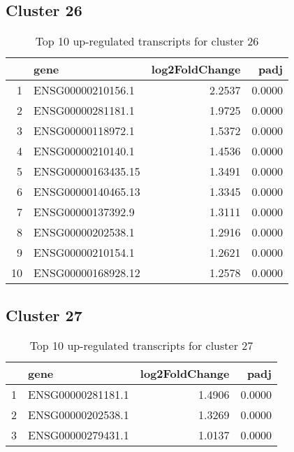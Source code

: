 \documentclass{article}
\begin{document}
\subsection{Cluster 26 }
\begin{table}[H]
\centering
\begin{tabularx}{\textwidth}{rlrr}
  \hline
 & gene & log2FoldChange & padj \\ 
  \hline
1 & ENSG00000210156.1 & 2.2537 & 0.0000 \\ 
  2 & ENSG00000281181.1 & 1.9725 & 0.0000 \\ 
  3 & ENSG00000118972.1 & 1.5372 & 0.0000 \\ 
  4 & ENSG00000210140.1 & 1.4536 & 0.0000 \\ 
  5 & ENSG00000163435.15 & 1.3491 & 0.0000 \\ 
  6 & ENSG00000140465.13 & 1.3345 & 0.0000 \\ 
  7 & ENSG00000137392.9 & 1.3111 & 0.0000 \\ 
  8 & ENSG00000202538.1 & 1.2916 & 0.0000 \\ 
  9 & ENSG00000210154.1 & 1.2621 & 0.0000 \\ 
  10 & ENSG00000168928.12 & 1.2578 & 0.0000 \\ 
   \hline
\end{tabularx}
\caption{Top 10 up-regulated transcripts for cluster 26} 
\label{tab:q3_1_26}
\end{table}
\subsection{Cluster 27 }
\begin{table}[H]
\centering
\begin{tabularx}{\textwidth}{rlrr}
  \hline
 & gene & log2FoldChange & padj \\ 
  \hline
1 & ENSG00000281181.1 & 1.4906 & 0.0000 \\ 
  2 & ENSG00000202538.1 & 1.3269 & 0.0000 \\ 
  3 & ENSG00000279431.1 & 1.0137 & 0.0000 \\ 
   \hline
\end{tabularx}
\caption{Top 10 up-regulated transcripts for cluster 27} 
\label{tab:q3_1_27}
\end{table}
\end{document}
